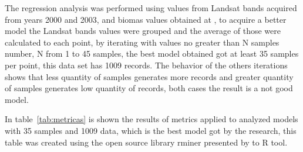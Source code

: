 The regression analysis was performed using values from Landsat bands acquired from years 2000 and 2003, and biomas values obtained at \cite{baccini2008afirst}, to acquire a better model the Landsat bands values were grouped and the average of those were calculated to each point, by iterating with values no greater than N samples number, N from 1 to 45 samples, the best model obtained got at least 35 samples per point, this data set has 1009 records. The behavior of the others iterations shows that less quantity of samples generates more records and greater quantity of samples generates low quantity of records, both cases the result is a not good model.

In table~\ref{tab:metricas} is shown the results of metrics applied to analyzed models with 35 samples and 1009 data, which is the best model got by the research, this table was created using the open source library rminer presented by \cite{cortez2010data} to R tool.

\begin{table}
\caption{Metrics applied to analyzed models with 35 samples and 1009 data}
\label{tab:metricas}
\centering
{}
\end{table}

